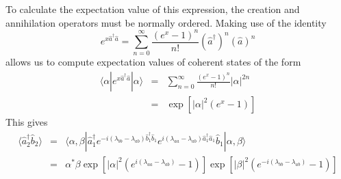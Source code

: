 \documentclass[12pt]{iopart}
\begin{document}
To calculate the expectation value of this expression, the creation and annihilation operators must be normally ordered. Making use of the identity \cite{louisell}
\begin{equation}
e^{x \hat{a}^{\dagger} \hat{a}} = \sum_{n=0}^{\infty} \frac{(e^x - 1)^n} {n!} (\hat{a}^{\dagger})^n (\hat{a})^n
\end{equation}
allows us to compute expectation values of coherent states of the form
\begin{eqnarray}
\langle \alpha | e^{x \hat{a}^{\dagger} \hat{a}} |\alpha \rangle &=& \sum_{n=0}^{\infty} \frac{(e^x - 1)^n} {n!} |\alpha|^{2n} \nonumber \\
%
&=& \exp[|\alpha|^2(e^x -1)] \label{eqExpectationValueOfExponential}
\end{eqnarray}
This gives
\begin{eqnarray}
\langle \hat{a}^{\dagger}_2 \hat{b}_2 \rangle &=& \langle \alpha, \beta | \hat{a}^{\dagger}_1 e^{-i (\lambda_{bb} - \lambda_{ab}) \hat{b}^{\dagger}_1 \hat{b}_1} e^{i (\lambda_{aa} - \lambda_{ab}) \hat{a}^{\dagger}_1 \hat{a}_1} \hat{b}_1 | \alpha, \beta \rangle \nonumber \\
%
&=& \alpha^* \beta \exp[|\alpha|^2(e^{i (\lambda_{aa} - \lambda_{ab})} -1)] \exp[|\beta|^2 (e^{-i (\lambda_{bb} - \lambda_{ab})} -1)]
\end{eqnarray}
\end{document}
